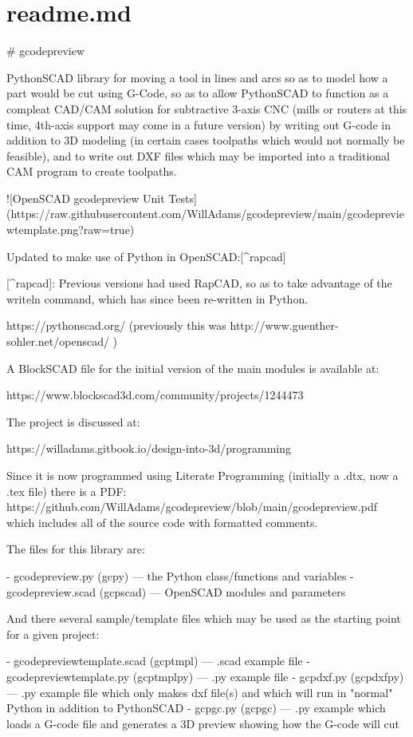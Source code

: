 \documentclass{ltxdoc}
\begin{document}
\clearpage
\section{readme.md}

\begin{readme}
# gcodepreview

PythonSCAD library for moving a tool in lines and arcs so as to model how a part would be cut using G-Code, so as to allow PythonSCAD to function as a compleat CAD/CAM solution for subtractive 3-axis CNC (mills or routers at this time, 4th-axis support may come in a future version) by writing out G-code in addition to 3D modeling (in certain cases toolpaths which would not normally be feasible), and to write out DXF files which may be imported into a traditional CAM program to create toolpaths. 

![OpenSCAD gcodepreview Unit Tests](https://raw.githubusercontent.com/WillAdams/gcodepreview/main/gcodepreviewtemplate.png?raw=true)

Updated to make use of Python in OpenSCAD:[^rapcad]

[^rapcad]: Previous versions had used RapCAD, so as to take advantage of the writeln command, which has since been re-written in Python.

https://pythonscad.org/ (previously this was http://www.guenther-sohler.net/openscad/ )

A BlockSCAD file for the initial version of the 
main modules is available at:

https://www.blockscad3d.com/community/projects/1244473

The project is discussed at:

https://willadams.gitbook.io/design-into-3d/programming

Since it is now programmed using Literate Programming (initially a .dtx, now a .tex file) there is a PDF: https://github.com/WillAdams/gcodepreview/blob/main/gcodepreview.pdf which includes all of the source code with formatted comments.

The files for this library are:

 - gcodepreview.py (gcpy) --- the Python class/functions and variables
 - gcodepreview.scad (gcpscad) --- OpenSCAD modules and parameters

And there several sample/template files which may be used as the starting point for a given project:

 - gcodepreviewtemplate.scad (gcptmpl) --- .scad example file
 - gcodepreviewtemplate.py (gcptmplpy) --- .py example file 
 - gcpdxf.py (gcpdxfpy) --- .py example file which only makes dxf file(s) and which will run in "normal" Python in addition to PythonSCAD
 - gcpgc.py (gcpgc) --- .py example which loads a G-code file and generates a 3D preview showing how the G-code will cut


\end{readme}
\end{document}
